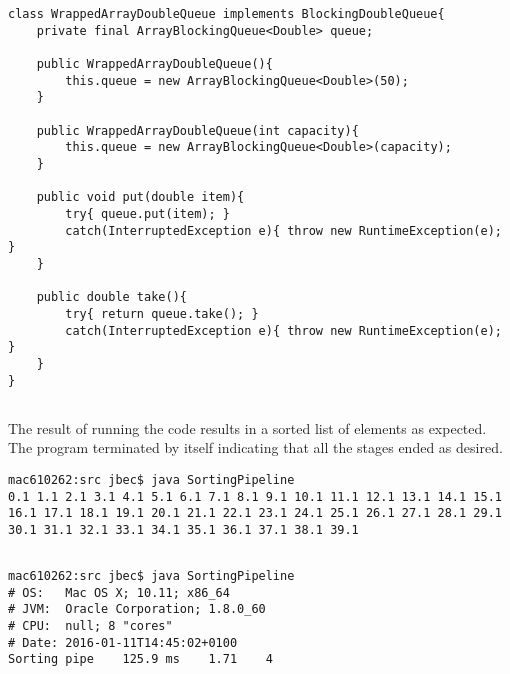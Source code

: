 \documentclass{ituhandin}
\begin{document}
\chapter{} %
\section{} %
\begin{lstlisting}[caption=Implemented code for wrapping \texttt{ArrayBlockingQueue}]
class WrappedArrayDoubleQueue implements BlockingDoubleQueue{
    private final ArrayBlockingQueue<Double> queue;

    public WrappedArrayDoubleQueue(){
        this.queue = new ArrayBlockingQueue<Double>(50);
    }

    public WrappedArrayDoubleQueue(int capacity){
        this.queue = new ArrayBlockingQueue<Double>(capacity);
    }

    public void put(double item){
        try{ queue.put(item); }
        catch(InterruptedException e){ throw new RuntimeException(e); }
    }

    public double take(){
        try{ return queue.take(); }
        catch(InterruptedException e){ throw new RuntimeException(e); }
    }
}
\end{lstlisting}
\section{} %
The result of running the code results in a sorted list of elements as expected. The program terminated by itself indicating that all the stages ended as desired.
\begin{lstlisting}[language={},frame={}]
mac610262:src jbec$ java SortingPipeline
0.1 1.1 2.1 3.1 4.1 5.1 6.1 7.1 8.1 9.1 10.1 11.1 12.1 13.1 14.1 15.1 16.1 17.1 18.1 19.1 20.1 21.1 22.1 23.1 24.1 25.1 26.1 27.1 28.1 29.1 30.1 31.1 32.1 33.1 34.1 35.1 36.1 37.1 38.1 39.1
\end{lstlisting}
\section{}\label{sec:sortingpipelinetests}


\begin{lstlisting}[language={},frame={}]
mac610262:src jbec$ java SortingPipeline
# OS:   Mac OS X; 10.11; x86_64
# JVM:  Oracle Corporation; 1.8.0_60
# CPU:  null; 8 "cores"
# Date: 2016-01-11T14:45:02+0100
Sorting pipe    125.9 ms    1.71    4
\end{lstlisting}
\end{document}
